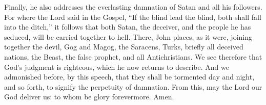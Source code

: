 Finally, he also addresses the everlasting damnation of Satan and all his followers. For where the Lord said in the Gospel, “If the blind lead the blind, both shall fall into the ditch,” it follows that both Satan, the deceiver, and the people he has seduced, will be carried together to hell. There, John places, as it were, joining together the devil, Gog and Magog, the Saracens, Turks, briefly all deceived nations, the Beast, the false prophet, and all Antichristians. We see therefore that God’s judgment is righteous, which he now returns to describe. And we admonished before, by this speech, that they shall be tormented day and night, and so forth, to signify the perpetuity of damnation. From this, may the Lord our God deliver us: to whom be glory forevermore. Amen.
